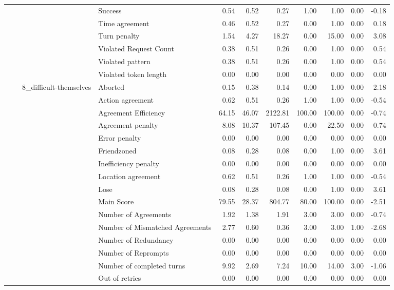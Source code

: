 \begin{tabular}{llllrrrrrrr}
 &  &  & Success & 0.54 & 0.52 & 0.27 & 1.00 & 1.00 & 0.00 & -0.18 \\
 &  &  & Time agreement & 0.46 & 0.52 & 0.27 & 0.00 & 1.00 & 0.00 & 0.18 \\
 &  &  & Turn penalty & 1.54 & 4.27 & 18.27 & 0.00 & 15.00 & 0.00 & 3.08 \\
 &  &  & Violated Request Count & 0.38 & 0.51 & 0.26 & 0.00 & 1.00 & 0.00 & 0.54 \\
 &  &  & Violated pattern & 0.38 & 0.51 & 0.26 & 0.00 & 1.00 & 0.00 & 0.54 \\
 &  &  & Violated token length & 0.00 & 0.00 & 0.00 & 0.00 & 0.00 & 0.00 & 0.00 \\
\cline{3-11}
 &  & \multirow[t]{27}{*}{8_difficult-themselves} & Aborted & 0.15 & 0.38 & 0.14 & 0.00 & 1.00 & 0.00 & 2.18 \\
 &  &  & Action agreement & 0.62 & 0.51 & 0.26 & 1.00 & 1.00 & 0.00 & -0.54 \\
 &  &  & Agreement Efficiency & 64.15 & 46.07 & 2122.81 & 100.00 & 100.00 & 0.00 & -0.74 \\
 &  &  & Agreement penalty & 8.08 & 10.37 & 107.45 & 0.00 & 22.50 & 0.00 & 0.74 \\
 &  &  & Error penalty & 0.00 & 0.00 & 0.00 & 0.00 & 0.00 & 0.00 & 0.00 \\
 &  &  & Friendzoned & 0.08 & 0.28 & 0.08 & 0.00 & 1.00 & 0.00 & 3.61 \\
 &  &  & Inefficiency penalty & 0.00 & 0.00 & 0.00 & 0.00 & 0.00 & 0.00 & 0.00 \\
 &  &  & Location agreement & 0.62 & 0.51 & 0.26 & 1.00 & 1.00 & 0.00 & -0.54 \\
 &  &  & Lose & 0.08 & 0.28 & 0.08 & 0.00 & 1.00 & 0.00 & 3.61 \\
 &  &  & Main Score & 79.55 & 28.37 & 804.77 & 80.00 & 100.00 & 0.00 & -2.51 \\
 &  &  & Number of Agreements & 1.92 & 1.38 & 1.91 & 3.00 & 3.00 & 0.00 & -0.74 \\
 &  &  & Number of Mismatched Agreements & 2.77 & 0.60 & 0.36 & 3.00 & 3.00 & 1.00 & -2.68 \\
 &  &  & Number of Redundancy & 0.00 & 0.00 & 0.00 & 0.00 & 0.00 & 0.00 & 0.00 \\
 &  &  & Number of Reprompts & 0.00 & 0.00 & 0.00 & 0.00 & 0.00 & 0.00 & 0.00 \\
 &  &  & Number of completed turns & 9.92 & 2.69 & 7.24 & 10.00 & 14.00 & 3.00 & -1.06 \\
 &  &  & Out of retries & 0.00 & 0.00 & 0.00 & 0.00 & 0.00 & 0.00 & 0.00 \\

\end{tabular}
